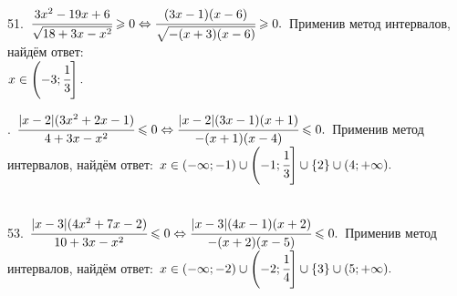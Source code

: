 \documentclass[12pt]{article}
\begin{document}
51. $\cfrac{3x^2-19x+6}{\sqrt{18+3x-x^2}}\geqslant0\Leftrightarrow\cfrac{(3x-1)(x-6)}{\sqrt{-(x+3)(x-6)}}\geqslant0.$ Применив метод интервалов, найдём ответ:\\ $x\in\left(-3;\cfrac{1}{3}\right].$
\begin{figure}[ht!]
\end{figure}\newpage{}. $\cfrac{|x-2|(3x^2+2x-1)}{4+3x-x^2}\leqslant0\Leftrightarrow\cfrac{|x-2|(3x-1)(x+1)}{-(x+1)(x-4)}\leqslant0.$ Применив метод интервалов, найдём ответ: $x\in(-\infty;-1)\cup\left(-1;\cfrac{1}{3}\right]\cup\{2\}\cup(4;+\infty).$
\begin{figure}[ht!]
\end{figure}\\
53. $\cfrac{|x-3|(4x^2+7x-2)}{10+3x-x^2}\leqslant0\Leftrightarrow\cfrac{|x-3|(4x-1)(x+2)}{-(x+2)(x-5)}\leqslant0.$ Применив метод интервалов, найдём ответ: $x\in(-\infty;-2)\cup\left(-2;\cfrac{1}{4}\right]\cup\{3\}\cup(5;+\infty).$
\begin{figure}[ht!]
\end{figure}\\
\end{document}
